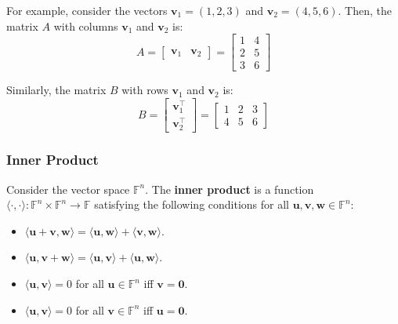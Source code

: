 \documentclass[../lecture-notes.tex]{subfiles}
\begin{document}
\begin{example}
    For example, consider the vectors $\mathbf{v}_1 = (1,2,3)$ and $\mathbf{v}_2 = (4,5,6)$. Then, the matrix $A$ with columns $\mathbf{v}_1$ and $\mathbf{v}_2$ is:
    \begin{equation*}
        A = \begin{bmatrix}
            \mathbf{v}_1 & \mathbf{v}_2
        \end{bmatrix} = \begin{bmatrix}
            1 & 4 \\
            2 & 5 \\
            3 & 6
        \end{bmatrix}
    \end{equation*}

    Similarly, the matrix $B$ with rows $\mathbf{v}_1$ and $\mathbf{v}_2$ is:
    \begin{equation*}
        B = \begin{bmatrix}
            \mathbf{v}_1^{\top} \\ \mathbf{v}_2^{\top}
        \end{bmatrix} = \begin{bmatrix}
            1 & 2 & 3 \\
            4 & 5 & 6
        \end{bmatrix}
    \end{equation*}
\end{example}

\subsubsection{Inner Product}

\begin{definition}
    Consider the vector space $\mathbb{F}^n$. The \textbf{inner product} is a function $\langle \cdot, \cdot \rangle: \mathbb{F}^n \times \mathbb{F}^n \to \mathbb{F}$ satisfying the following conditions for all $\mathbf{u},\mathbf{v},\mathbf{w} \in \mathbb{F}^n$:
    \begin{itemize}
        \item $\langle \mathbf{u} + \mathbf{v}, \mathbf{w} \rangle = \langle \mathbf{u}, \mathbf{w} \rangle + \langle \mathbf{v}, \mathbf{w} \rangle$.
        \item $\langle \mathbf{u}, \mathbf{v} + \mathbf{w} \rangle = \langle \mathbf{u}, \mathbf{v} \rangle + \langle \mathbf{u}, \mathbf{w} \rangle$.
        \item $\langle \mathbf{u}, \mathbf{v} \rangle = 0$ for all $\mathbf{u} \in \mathbb{F}^n$ iff $\mathbf{v} = \mathbf{0}$.
        \item $\langle \mathbf{u}, \mathbf{v} \rangle = 0$ for all $\mathbf{v} \in \mathbb{F}^n$ iff $\mathbf{u} = \mathbf{0}$.
    \end{itemize}
\end{definition}
\end{document}
